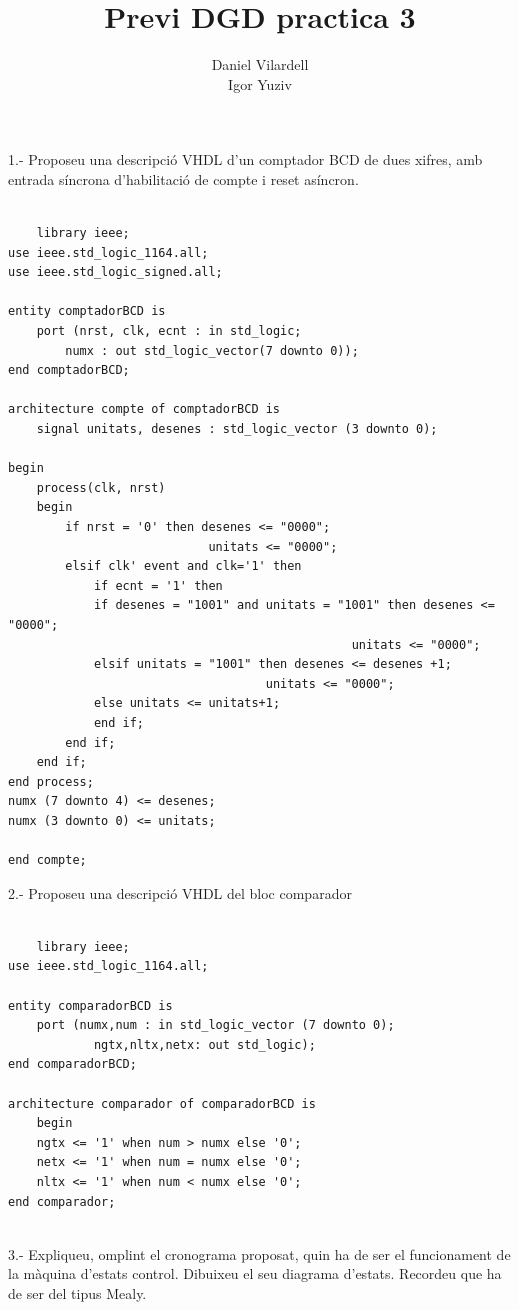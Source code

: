 \documentclass[12pt, a4papre]{article}
\author{Daniel Vilardell\\
	   Igor Yuziv}
\title{Previ DGD practica 3}
\date{}
\begin{document}
	\maketitle

	1.- Proposeu una descripció VHDL d’un comptador BCD de dues xifres, amb entrada
síncrona d’habilitació de compte i reset asíncron.

	\begin{lstlisting}[style=vhdl, frame=single, basicstyle=\tiny]
	
	library ieee;
use ieee.std_logic_1164.all;
use ieee.std_logic_signed.all;

entity comptadorBCD is
	port (nrst, clk, ecnt : in std_logic;
		numx : out std_logic_vector(7 downto 0));
end comptadorBCD;

architecture compte of comptadorBCD is 
	signal unitats, desenes : std_logic_vector (3 downto 0);
	
begin 
	process(clk, nrst)
	begin
		if nrst = '0' then desenes <= "0000";
							unitats <= "0000";
		elsif clk' event and clk='1' then
			if ecnt = '1' then
			if desenes = "1001" and unitats = "1001" then desenes <= "0000";
												unitats <= "0000";
			elsif unitats = "1001" then desenes <= desenes +1;
									unitats <= "0000";
			else unitats <= unitats+1;
			end if;
		end if;
	end if;
end process;
numx (7 downto 4) <= desenes;
numx (3 downto 0) <= unitats;

end compte;
\end{lstlisting}


2.- Proposeu una descripció VHDL del bloc comparador

	\begin{lstlisting}[style=vhdl, frame=single, basicstyle=\tiny]
	
	library ieee;
use ieee.std_logic_1164.all;

entity comparadorBCD is 
	port (numx,num : in std_logic_vector (7 downto 0);
			ngtx,nltx,netx: out std_logic);
end comparadorBCD;

architecture comparador of comparadorBCD is 
	begin
	ngtx <= '1' when num > numx else '0';
	netx <= '1' when num = numx else '0';
	nltx <= '1' when num < numx else '0';
end comparador;
	
	\end{lstlisting}
	
	3.- Expliqueu, omplint el cronograma proposat, quin ha de ser el funcionament de la
màquina d’estats control. Dibuixeu el seu diagrama d’estats. Recordeu que ha de ser
del tipus Mealy.
\end{document}

